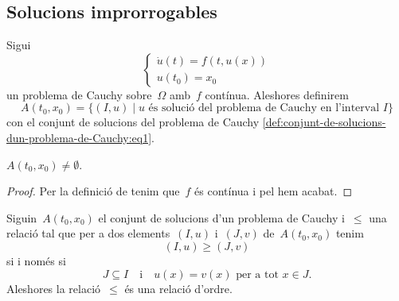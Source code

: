 \documentclass[../../main.tex]{subfiles}
\begin{document}
    \subsection{Solucions improrrogables}
    \begin{definition}
        \label{def:conjunt-de-solucions-dun-problema-de-Cauchy}
        Sigui
        \begin{equation}
            \label{def:conjunt-de-solucions-dun-problema-de-Cauchy:eq1}
            \begin{cases}
                \displaystyle \dot{u}(t)=f(t,u(x)) \\
                \displaystyle u(t_{0})=x_{0}
            \end{cases}
        \end{equation}
        un problema de Cauchy sobre~\(\Omega\) amb~\(f\) contínua.
        Aleshores definirem
        \[
            A(t_{0},x_{0})=\{(I,u)\mid u\text{ és solució del problema de Cauchy en l'interval }I\}
        \]
        con el conjunt de solucions del problema de Cauchy \eqref{def:conjunt-de-solucions-dun-problema-de-Cauchy:eq1}.
    \end{definition}
    \begin{observation}
        \label{obs:el-conjunt-de-solucions-dun-problema-de-Cauchy-amb-f-continua-es-no-buit}
        \(A(t_{0},x_{0})\neq\emptyset\).
    \end{observation}
    \begin{proof}
        Per la definició de  tenim que~\(f\) és contínua i pel  hem acabat.
    \end{proof}
    \begin{proposition}
        \label{prop:la-prolongacio-es-una-relacio-dordre}
        Siguin~\(A(t_{0},x_{0})\) el conjunt de solucions d'un problema de Cauchy i~\(\leq\) una relació tal que per a dos elements~\((I,u)\) i~\((J,v)\) de~\(A(t_{0},x_{0})\) tenim
        \[
            (I,u)\geq(J,v)
        \]
        si i només si
        \[
            J\subseteq I\quad\text{i}\quad u(x)=v(x)\text{ per a tot }x\in J.
        \]
        Aleshores la relació~\(\leq\) és una relació d'ordre.
    \end{proposition}
\end{document}
